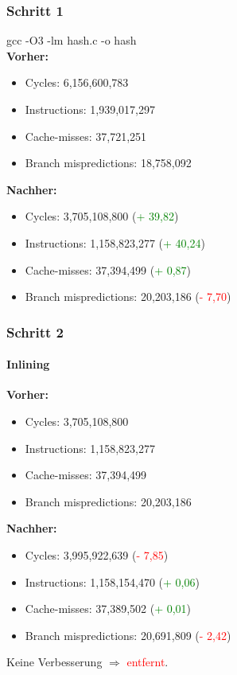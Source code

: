 \documentclass{beamer}
\newcommand{\success}[1]{\textcolor{green}{#1}}
\newcommand{\fail}[1]{\textcolor{red}{#1}}
\begin{document}
  \begin{frame}
  	\frametitle{Schritt 1}
  	gcc -O3 -lm hash.c -o hash\\[1em]
  	\textbf{Vorher:}
  	\begin{itemize}
			\item Cycles: 6,156,600,783\\
			\item Instructions: 1,939,017,297\\
			\item Cache-misses: 37,721,251\\
			\item Branch mispredictions: 18,758,092\\
		\end{itemize}	
		
		\textbf{Nachher:}
  	\begin{itemize}
			\item Cycles: 3,705,108,800 (\success{+ 39,82})\\
			\item Instructions: 1,158,823,277 (\success{+ 40,24})\\
			\item Cache-misses: 37,394,499 (\success{+ 0,87})\\
			\item Branch mispredictions: 20,203,186 (\fail{- 7,70})\\
		\end{itemize}	
  \end{frame}
  
  \begin{frame}
  	\frametitle{Schritt 2}
		\framesubtitle{Inlining}
  	\textbf{Vorher:}
  	\begin{itemize}
			\item Cycles: 3,705,108,800 \\
			\item Instructions: 1,158,823,277\\
			\item Cache-misses: 37,394,499\\
			\item Branch mispredictions: 20,203,186\\
		\end{itemize}	
				
		\textbf{Nachher:}
  	\begin{itemize}
			\item Cycles: 3,995,922,639 (\fail{- 7,85})\\
			\item Instructions:  1,158,154,470 (\success{+ 0,06})\\
			\item Cache-misses: 37,389,502 (\success{+ 0,01})\\
			\item Branch mispredictions: 20,691,809 (\fail{- 2,42})\\
		\end{itemize}			
		Keine Verbesserung $\Rightarrow$ \fail{entfernt}.
  \end{frame}
  
\end{document}

